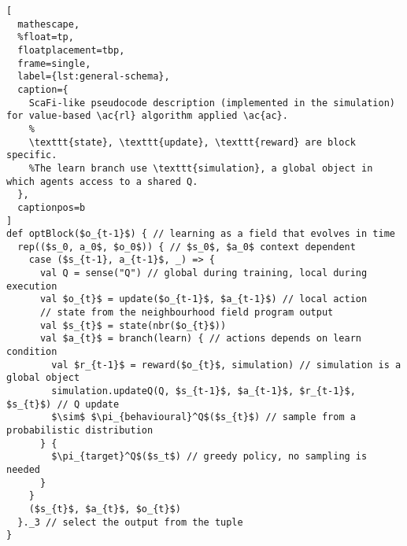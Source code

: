 
\begin{lstlisting}[
  mathescape,
  %float=tp,
  floatplacement=tbp,
  frame=single,
  label={lst:general-schema},
  caption={
    ScaFi-like pseudocode description (implemented in the simulation) for value-based \ac{rl} algorithm applied \ac{ac}.
    %
    \texttt{state}, \texttt{update}, \texttt{reward} are block specific. 
    %The learn branch use \texttt{simulation}, a global object in which agents access to a shared Q.
  },
  captionpos=b
]
def optBlock($o_{t-1}$) { // learning as a field that evolves in time
  rep(($s_0, a_0$, $o_0$)) { // $s_0$, $a_0$ context dependent 
    case ($s_{t-1}, a_{t-1}$, _) => {
      val Q = sense("Q") // global during training, local during execution
      val $o_{t}$ = update($o_{t-1}$, $a_{t-1}$) // local action
      // state from the neighbourhood field program output
      val $s_{t}$ = state(nbr($o_{t}$))
      val $a_{t}$ = branch(learn) { // actions depends on learn condition
        val $r_{t-1}$ = reward($o_{t}$, simulation) // simulation is a global object
        simulation.updateQ(Q, $s_{t-1}$, $a_{t-1}$, $r_{t-1}$, $s_{t}$) // Q update
        $\sim$ $\pi_{behavioural}^Q$($s_{t}$) // sample from a probabilistic distribution
      } {
        $\pi_{target}^Q$($s_t$) // greedy policy, no sampling is needed
      }
    }
    ($s_{t}$, $a_{t}$, $o_{t}$) 
  }._3 // select the output from the tuple
}
  \end{lstlisting}
